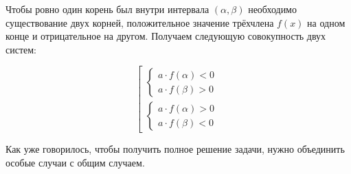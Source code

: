 Чтобы ровно один корень был внутри интервала $(\alpha, \beta)$ необходимо существование двух корней,
положительное значение трёхчлена $f(x)$ на одном конце и отрицательное на другом. Получаем
следующую совокупность двух систем:

\begin {equation*}
    \left[
        \begin {gathered} 
            \begin {cases}
                a \cdot f(\alpha) < 0
                \\
                a \cdot f(\beta) > 0
            \end {cases}
            \\
            \begin {cases}
                a \cdot f(\alpha) > 0
                \\
                a \cdot f(\beta) < 0
            \end {cases}
        \end {gathered} 
    \right.
\end {equation*}

Как уже говорилось, чтобы получить полное решение задачи, нужно объединить особые случаи с общим
случаем.